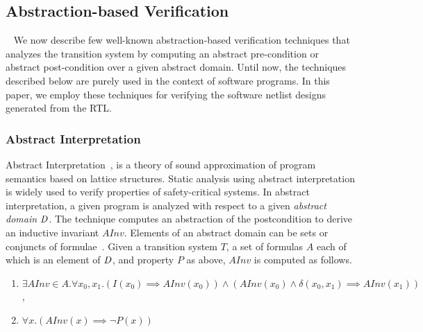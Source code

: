 \subsection{Abstraction-based Verification}~\label{software-verif}
%
We now describe few well-known abstraction-based verification 
techniques that analyzes the transition system by computing an 
abstract pre-condition or abstract post-condition over a given 
abstract domain. Until now, the techniques described below 
are purely used in the context of software programs. In this paper, 
we employ these techniques for verifying the software netlist designs 
generated from the RTL. 
\subsubsection{Abstract Interpretation} 
%
Abstract Interpretation~\cite{Cousot92,CC79,DBLP:conf/emsoft/Cousot07},
is a theory of sound approximation of program semantics based on lattice 
structures. Static analysis using abstract interpretation is widely used 
to verify properties of safety-critical systems. 
%
In abstract interpretation, a given program is analyzed 
with respect to a given \textit{abstract domain} $\mathit{D}$.  
The technique computes an abstraction of the postcondition to derive an 
inductive invariant $AInv$.
Elements of an abstract domain can be sets or conjuncts 
of formulae~\cite{DBLP:conf/vmcai/BrainDHGK13}.  
Given a transition system $T$, a set of formulas $A$ each of which is an 
element of $\mathit{D}$, and property $P$ as above, $AInv$ is computed as follows. 
%
\begin{enumerate}
\item  $\exists AInv \in A. \forall x_0, x_1. (I(x_0) \implies AInv(x_0)) 
\wedge (AInv(x_0) \wedge \delta(x_0, x_1) \implies AInv(x_1))$, 
\item $\forall x. (AInv(x) \implies \neg{P(x)})$
\end{enumerate}
%
